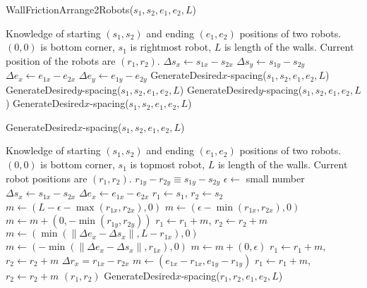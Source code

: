 \begin{algorithm}
\caption{WallFrictionArrange2Robots($s_1,s_2,e_1,e_2,L$)}\label{alg:PosControl2Robots}
\begin{algorithmic}[1]
\Require 
Knowledge of starting $(s_1,s_2)$ and ending $(e_1,e_2)$ positions of  two robots. 
$(0,0)$ is bottom corner, $s_1$ is rightmost robot, 
 $L$ is length of the walls. 
 Current position of the robots are $(r_1,r_2)$.
\State $\Delta s_x \gets s_{1x} - s_{2x}$
\State $\Delta s_y \gets s_{1y} - s_{2y}$
\State $\Delta e_x \gets  e_{1x} - e_{2x} $
\State $ \Delta e_y \gets e_{1y} - e_{2y}$
\State GenerateDesired$x$-spacing($s_1,s_2,e_1,e_2,L$)
\State GenerateDesired$y$-spacing($s_1,s_2,e_1,e_2,L$)
\Else
\State GenerateDesired$y$-spacing($s_1,s_2,e_1,e_2,L$)
\State GenerateDesired$x$-spacing($s_1,s_2,e_1,e_2,L$)
\EndIf

\end{algorithmic}
\end{algorithm}


\begin{algorithm}
\caption{GenerateDesired$x$-spacing($s_1,s_2,e_1,e_2,L$)}\label{alg:XControl}
\begin{algorithmic}[1]
\Require Knowledge of starting $(s_1,s_2)$ and ending $(e_1,e_2)$ positions of  two robots. 
$(0,0)$ is bottom corner, $s_1$ is topmost robot, 
 $L$ is length of the walls. Current robot positions are $(r_1,r_2)$.
\Ensure   $ r_{1y} - r_{2y}  \equiv s_{1y} - s_{2y} $   %
\State $\epsilon \gets $ small number
\State $ \Delta s_x  \gets s_{1x} - s_{2x} $
\State $ \Delta e_x \gets e_{1x} - e_{2x} $
\State $ r_1 \gets s_1$, $ r_2 \gets s_2$
\State $ m \gets ( L-\epsilon-\max( r_{1x},r_{2x}) ,0)   $ 
\Else 
\State  $ m \gets ( \epsilon-\min( r_{1x},r_{2x}),0 )    $ 
\EndIf
\State $m  \gets  m + (0, -\min( r_{1y},r_{2y} ))$ 
\State $ r_1 \gets r_1+m$, $ r_2 \gets r_2+m$ 
\State $ m \gets (\min(\|\Delta e_x - \Delta s_x \|, L- r_{1x}), 0)$  
\Else
\State $ m \gets (-\min(\|\Delta e_x - \Delta s_x \|, r_{1x}), 0)$
\EndIf 
\State $m  \gets  m + (0, \epsilon)$ 
\State $ r_1 \gets r_1+m$, $ r_2 \gets r_2+m$ 
\State $\Delta r_x = r_{1x} - r_{2x}$
\State   $ m \gets (e_{1x}-r_{1x}, e_{1y}-r_{1y})$
\State $ r_1 \gets r_1+m$, $ r_2 \gets r_2+m$ 
\State  \Return $(r_1,r_2)$
\Else   
\State \Return GenerateDesired$x$-spacing($r_1,r_2,e_1,e_2,L$)
\EndIf
\end{algorithmic}
\end{algorithm}

